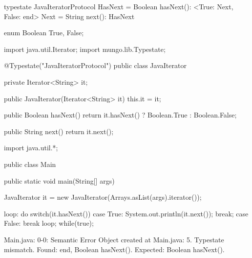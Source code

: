 \begin{code}
typestate JavaIteratorProtocol {
  HasNext = {
    Boolean hasNext(): <True: Next, False: end>
  }
  Next = {
    String next(): HasNext
  }
}\end{code}

\begin{code}
enum Boolean {
	True, False;
}\end{code}

\begin{code}
import java.util.Iterator;
import mungo.lib.Typestate;

@Typestate("JavaIteratorProtocol")
public class JavaIterator {

  private Iterator<String> it;

  public JavaIterator(Iterator<String> it) {
    this.it = it;
  }

	public Boolean hasNext() {
    return it.hasNext() ? Boolean.True : Boolean.False;
  }

  public String next() {
    return it.next();
  }

}\end{code}

\begin{code}
import java.util.*;

public class Main {
	public static void main(String[] args) {
		JavaIterator it = new JavaIterator(Arrays.asList(args).iterator());

    loop: do {
      switch(it.hasNext()) {
        case True:
          System.out.println(it.next());
          break;
        case False:
          break loop;
      }
    } while(true);
	}
}\end{code}

\lstset{caption=Original Mungo output}
\begin{code}

Main.java: 0-0: Semantic Error
		Object created at Main.java: 5. Typestate mismatch. Found: end, Boolean hasNext(). Expected: Boolean hasNext().
\end{code}

\lstset{caption=New Mungo output}
\begin{code}
\end{code}

